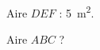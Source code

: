
\begin{mental}
    

Aire \( DEF\) : \SI{5}{\meter\squared}.

\begin{center}
   
\end{center}

Aire \( ABC\) ?


\end{mental}
